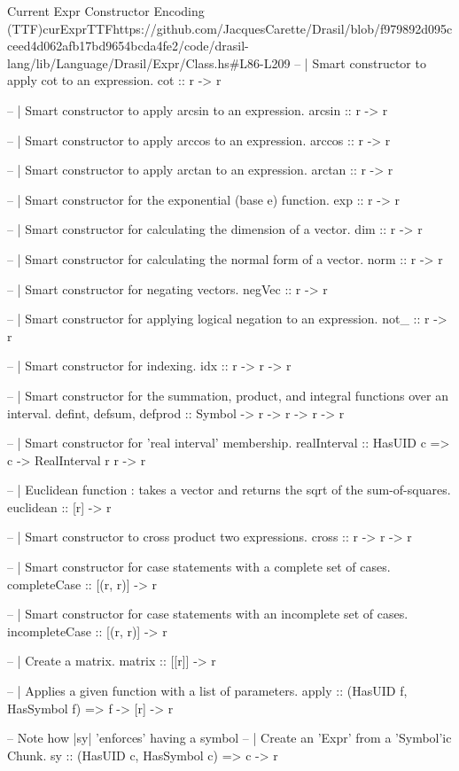 \begin{haskell}{Current Expr Constructor Encoding (TTF)}{curExprTTF}{https://github.com/JacquesCarette/Drasil/blob/f979892d095cceed4d062afb17bd9654bcda4fe2/code/drasil-lang/lib/Language/Drasil/Expr/Class.hs\#L86-L209}
  -- | Smart constructor to apply cot to an expression.
  cot :: r -> r 
  
  -- | Smart constructor to apply arcsin to an expression.
  arcsin :: r -> r 
  
  -- | Smart constructor to apply arccos to an expression.
  arccos :: r -> r 
  
  -- | Smart constructor to apply arctan to an expression.
  arctan :: r -> r 
  
  -- | Smart constructor for the exponential (base e) function.
  exp :: r -> r
  
  -- | Smart constructor for calculating the dimension of a vector.
  dim :: r -> r
  
  -- | Smart constructor for calculating the normal form of a vector.
  norm :: r -> r
  
  -- | Smart constructor for negating vectors.
  negVec :: r -> r
  
  -- | Smart constructor for applying logical negation to an expression.
  not_ :: r -> r
  
  -- | Smart constructor for indexing.
  idx :: r -> r -> r
  
  -- | Smart constructor for the summation, product, and integral functions over an interval.
  defint, defsum, defprod :: Symbol -> r -> r -> r -> r
  
  -- | Smart constructor for 'real interval' membership.
  realInterval :: HasUID c => c -> RealInterval r r -> r
  
  -- | Euclidean function : takes a vector and returns the sqrt of the sum-of-squares.
  euclidean :: [r] -> r
  
  -- | Smart constructor to cross product two expressions.
  cross :: r -> r -> r
  
  -- | Smart constructor for case statements with a complete set of cases.
  completeCase :: [(r, r)] -> r
  
  -- | Smart constructor for case statements with an incomplete set of cases.
  incompleteCase :: [(r, r)] -> r
  
  -- | Create a matrix.
  matrix :: [[r]] -> r


  -- | Applies a given function with a list of parameters.
  apply :: (HasUID f, HasSymbol f) => f -> [r] -> r
   
  -- Note how |sy| 'enforces' having a symbol
  -- | Create an 'Expr' from a 'Symbol'ic Chunk.
  sy :: (HasUID c, HasSymbol c) => c -> r
\end{haskell}
